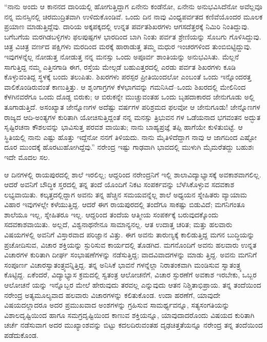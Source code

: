 “ನಾನು ಅಂದು ಆ ಕಾನನದ ದಾರಿಯಲ್ಲಿ ಹೋಗುತ್ತಿದ್ದಾಗ ಏನೇನು ಕಂಡೆನೋ, ಏನೇನು ಅನುಭವಿಸಿದೆನೋ ಅವೆಲ್ಲವೂ ನನ್ನ ಮನಸ್ಸಿನಲ್ಲಿ ಚಿರಮುದ್ರಿತವಾಗಿ ಉಳಿದುಕೊಂಡಿವೆ. ಒಂದು ದಿನ ನಾವು ವಿಂಧ್ಯಪರ್ವತದ ಕಣಿವೆಯೊಂದರ ಮೂಲಕ ಪ್ರಯಾಣ ಮಾಡುತ್ತಿದ್ದೆವು. ದಾರಿಯ ಅಕ್ಕಪಕ್ಕದಲ್ಲಿ ಉನ್ನತ ಪರ್ವತಶಿಖರಗಳು ಆಗಸದೆತ್ತರಕ್ಕೆ ನಿಮಿರಿ ನಿಂತಿದ್ದುವು. ಬಗೆಬಗೆಯ ಮರಗಿಡಬಳ್ಳಿಗಳು ಫಲಪುಷ್ಪಗಳ ಭಾರದಿಂದ ಬಾಗಿ ನಿಂತು ಪರ್ವತ ಶ್ರೇಣಿಯನ್ನು ಸೊಬಗು ಗೊಳಿಸಿದ್ದುವು. ಚಿತ್ರ ವಿಚಿತ್ರ ವರ್ಣದ ಪಕ್ಷಿಗಳು ಮರದಿಂದ ಮರಕ್ಕೆ ಹಾರಾಡುತ್ತ ತಮ್ಮ ಮಧುರ ಇಂಚರಗಳಿಂದ ತುಂಬಿಬಿಟ್ಟಿದ್ದುವು. ಇವುಗಳನ್ನೆಲ್ಲ ನೋಡುತ್ತ ನೋಡುತ್ತ ನನ್ನ ಮನಸ್ಸು ಒಂದು ಅಪೂರ್ವ ಶಾಂತಿಯನ್ನು ಅನುಭವಿಸಿತು. ಮೆಲ್ಲನೆ ಸಾಗುತ್ತಿದ್ದ ನಮ್ಮ ಎತ್ತಿನಗಾಡಿ ಈಗ, ರಸ್ತೆಯ ಮೇಲ್ಗಡೆ ಬಹುಎತ್ತರದಲ್ಲಿ ಎರಡು ಪರ್ವತ ಶಿಖರಗಳು ಕೂಡಿ ಕೊಳ್ಳುವಂತಿದ್ದ ಸ್ಥಳಕ್ಕೆ ಬಂದು ತಲುಪಿತು. ಶಿಖರಗಳು ಪರಸ್ಪರ ಪ್ರೀತಿಯಿಂದಲೋ ಎಂಬಂತೆ ಒಂದು ಇನ್ನೊಂದರತ್ತ ವಾಲಿಕೊಂಡಿರುವಂತೆ ಕಾಣುತ್ತಿತ್ತು. ಆ ಶೃಂಗಾಗ್ರಗಳ ಕೆಳಭಾಗವನ್ನು ಗಮನಿಸಿದೆ–ಒಂದು ಶಿಖರದಲ್ಲಿ ಮೇಲಿನಿಂದ ಕೆಳಗಿನವರೆಗೂ ಒಂದು ದೊಡ್ಡ ಬಿರುಕು; ಆ ಬಿರುಕನ್ನೇ ಮುಚ್ಚುವಂತಹ ಒಂದು ಬೃಹದಾಕಾರದ ಜೇನುಗೂಡು ಅಲ್ಲಿ ತೂಗಾಡುತ್ತಿದೆ. ಅಸಂಖ್ಯಾತ ಜೇನ್ನೊಣಗಳ ಅದೆಷ್ಟು ವರ್ಷಗಳ ಪರಿಶ್ರಮದ ಫಲವೋ ಆ ಜೇನುಗೂಡು! ಜೇನ್ನೊಣಗಳ ರಾಜ್ಯದ ಆದಿ-ಅಂತ್ಯಗಳ ಕುರಿತಾಗಿ ಯೋಚಿಸುತ್ತಿದ್ದಂತೆ ನನ್ನ ಮನಸ್ಸು ತ್ರಿಭುವನ ಗಳ ಒಡೆಯನಾದ ಭಗವಂತನ ಅದ್ಭುತ ಸೃಷ್ಟಿರಚನಾ ಕೌಶಲವನ್ನು ಭಾವಿಸುತ್ತ ಪರವಶ ವಾಯಿತು; ನಾನು ಬಾಹ್ಯಪ್ರಜ್ಞೆ ತಪ್ಪಿ ಹಾಗೆಯೇ ಕುಳಿತುಬಿಟ್ಟೆ. ಆ ಸ್ಥಿತಿಯಲ್ಲಿ ನಾನು ಎಷ್ಟು ಹೊತ್ತು ಇದ್ದೆನೋ ನನಗೆ ತಿಳಿಯದು. ನಾನು ಮೈತಿಳಿದೆದ್ದಾಗ ನಾವು ಆ ಜಾಗದಿಂದ ಎಷ್ಟೋ ದೂರ ಮುಂದಕ್ಕೆ ಹೊರಟುಹೋಗಿದ್ದೆವು.” ನರೇಂದ್ರ ಇಷ್ಟು ಗಾಢವಾಗಿ ಭಾವದಲ್ಲಿ ಮುಳುಗಿ ಮೈಮರೆತದ್ದು ಬಹುಶಃ ಇದೇ ಮೊದಲ ಸಲ.

ಆ ದಿನಗಳಲ್ಲಿ ರಾಯಪುರದಲ್ಲಿ ಶಾಲೆ ಇರಲಿಲ್ಲ; ಆದ್ದರಿಂದ ನರೇಂದ್ರನಿಗೆ ಇಲ್ಲಿ ಶಾಲಾವಿದ್ಯಾಭ್ಯಾಸಕ್ಕೆ ಅವಕಾಶವಾಗಲಿಲ್ಲ. ಆದರೆ ಅವನಿಗೆ ಬೌದ್ಧಿಕ ಸ್ತರದಲ್ಲಿ ತನ್ನ ತಂದೆ ಯೊಂದಿಗೆ ನಿಕಟ ಸಂಪರ್ಕವನ್ನು ಬೆಳೆಸಿಕೊಳ್ಳುವ ಸದವಕಾಶ ಲಭ್ಯವಾಯಿತು. ಕಲ್ಕತ್ತದಲ್ಲಿದ್ದಾಗ ಅವನು ತನ್ನ ಹೆಚ್ಚಿನ ಸಮಯವನ್ನೆಲ್ಲ ಶಾಲೆ ಅಧ್ಯಯನ ಸ್ನೇಹಿತರು ವ್ಯಾಯಾಮ ವಿಹಾರ ಇವುಗಳಲ್ಲೇ ಕಳೆಯುತ್ತಿದ್ದ. ಆದರೆ ಈಗ ರಾಯಪುರದಲ್ಲಿ ತಂದೆಗೂ ಸಾಕಷ್ಟು ಬಿಡುವಿದೆ; ಮಗನಿಗಂತೂ ಶಾಲೆಯೂ ಇಲ್ಲ, ಸ್ನೇಹಿತರೂ ಇಲ್ಲ. ಆದ್ದರಿಂದ ತಂದೆಯ ಆತ್ಮೀಯ ಸಂಪರ್ಕಕ್ಕೆ ಬರುವುದಕ್ಕೊಂದು ಸದವಕಾಶವಾಯಿತು. ಅಲ್ಲದೆ, ವಿಶ್ವನಾಥನೇನೂ ಸಾಮಾನ್ಯನಲ್ಲ. ಆತ ಉದಾತ್ತ ಚರಿತ; ಮತ್ತು ಹಲವಾರು ವಿಷಯಗಳಲ್ಲಿ ಅವನಿಗೆ ವಿಸ್ತಾರವಾದ ಪರಿಜ್ಞಾನ ವಿತ್ತು. ಈಗ ಅವನು ತಾರುಣ್ಯಕ್ಕೆ ಕಾಲಿಡುತ್ತಿದ್ದ ಮಗನ ಬುದ್ಧಿಯನ್ನು ಪ್ರಚೋದಿಸುವ, ವಿಚಾರ ಶಕ್ತಿಯನ್ನು ಸ್ಫುರಿಸುವ ಕಾರ್ಯದಲ್ಲಿ ತೊಡಗಿದ. ಮಗನೊಂದಿಗೆ ಅವನು ಹಲವಾರು ಉನ್ನತ ವಿಚಾರಗಳ ಕುರಿತಾಗಿ ದೀರ್ಘ ಸಂಭಾಷಣೆಗಳನ್ನು ನಡೆಸುತ್ತಿದ್ದ; ವಾದವಿವಾದಗಳನ್ನು ಮಾಡು ತ್ತಿದ್ದ. ಅವನು ಮಗನಿಗೆ ಸಂಪೂರ್ಣ ವಿಚಾರಸ್ವಾತಂತ್ರ್ಯವನ್ನಿತ್ತಿದ್ದ. ತನ್ನ ಅನಿಸಿಕೆ ಭಾವನೆ ಗಳನ್ನೆಲ್ಲಾ ನಿರಾತಂಕವಾಗಿ ಮಂಡಿಸುವ ಸ್ವಾತಂತ್ರ್ಯ ಕೊಟ್ಟಿದ್ದ. ಏಕೆಂದರೆ, ವಿದ್ಯಾಭ್ಯಾಸ ಕ್ರಮದಲ್ಲಿ ಸ್ವತಂತ್ರ ಆಲೋಚನೆಗೆ, ವಿಚಾರ ಸ್ಫುರಣೆಗೆ ಅವಕಾಶ ಇರಬೇಕು, ಒಬ್ಬರ ಆಲೋಚನೆ ಯನ್ನು ಇನ್ನೊಬ್ಬರ ಮೇಲೆ ಹೇರುವುದು ತರವಲ್ಲ ಎನ್ನುವುದು ಆತನ ನಿಶ್ಚಿತಾಭಿಪ್ರಾಯ. ತನ್ನ ತಂದೆಯಿಂದ ನರೇಂದ್ರ ಅತ್ಯಮೂಲ್ಯವಾದ ಹಲವಾರು ವಿಚಾರಗಳನ್ನು ಕಲಿತುಕೊಂಡ. ಉದಾ ಹರಣೆಗೆ, ಯಾವುದೇ ವಿಷಯದಲ್ಲಾದರೂ ಅದರ ಪ್ರಮುಖವಾದ ಅಂಶಗಳನ್ನು ಗ್ರಹಿಸುವ ಸಾಮರ್ಥ್ಯವನ್ನೂ, ಸತ್ಯಸಂಗತಿಯನ್ನು ವಿಶಾಲದೃಷ್ಟಿಯಿಂದ ಹಾಗೂ ಸಮಗ್ರದೃಷ್ಟಿಯಿಂದ ಕಾಣುವ ಶಕ್ತಿಯನ್ನೂ, ಯಾವುದಾದರೊಂದು ವಿಷಯದ ಕುರಿತಾಗಿ ಚರ್ಚೆ ನಡೆಸುವಾಗ ಅದರ ಮುಖ್ಯಾಂಶವನ್ನು ಬಿಟ್ಟು ಕದಲದಿರುವಂತಹ ದೃಢಚಿತ್ತತೆಯನ್ನೂ ನರೇಂದ್ರ ತನ್ನ ತಂದೆಯಿಂದ ಪಡೆದುಕೊಂಡ.

